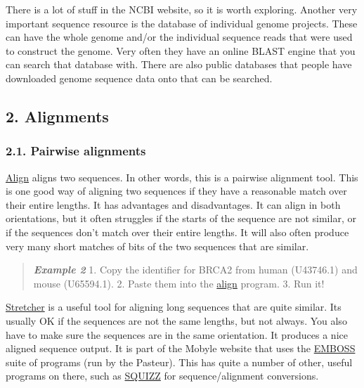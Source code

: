 \documentclass[]{article}
\begin{document}
There is a lot of stuff in the NCBI website, so it is worth exploring.
Another very important sequence resource is the database of individual
genome projects. These can have the whole genome and/or the individual
sequence reads that were used to construct the genome. Very often they
have an online BLAST engine that you can search that database with.
There are also public databases that people have downloaded genome
sequence data onto that can be searched.

\subsection{2. Alignments}\label{alignments}

\subsubsection{2.1. Pairwise alignments}\label{pairwise-alignments}

\href{http://blast.ncbi.nlm.nih.gov/Blast.cgi?PAGE_TYPE=BlastSearch\&BLAST_SPEC=blast2seq\&LINK_LOC=align2seq}{Align}
aligns two sequences. In other words, this is a pairwise alignment tool.
This is one good way of aligning two sequences if they have a reasonable
match over their entire lengths. It has advantages and disadvantages. It
can align in both orientations, but it often struggles if the starts of
the sequence are not similar, or if the sequences don't match over their
entire lengths. It will also often produce very many short matches of
bits of the two sequences that are similar.

\begin{quote}
\emph{\textbf{Example 2}} 1. Copy the identifier for BRCA2 from human
(U43746.1) and mouse (U65594.1). 2. Paste them into the
\href{http://blast.ncbi.nlm.nih.gov/Blast.cgi?PAGE_TYPE=BlastSearch\&BLAST_SPEC=blast2seq\&LINK_LOC=align2seq}{align}
program. 3. Run it!
\end{quote}

\href{http://mobyle.pasteur.fr/cgi-bin/MobylePortal/portal.py?form=stretcher}{Stretcher}
is a useful tool for aligning long sequences that are quite similar. Its
usually OK if the sequences are not the same lengths, but not always.
You also have to make sure the sequences are in the same orientation. It
produces a nice aligned sequence output. It is part of the Mobyle
website that uses the \href{http://emboss.sourceforge.net/}{EMBOSS}
suite of programs (run by the Pasteur). This has quite a number of
other, useful programs on there, such as
\href{http://mobyle.pasteur.fr/cgi-bin/portal.py\#forms::squizz_convert}{SQUIZZ}
for sequence/alignment conversions.
\end{document}

